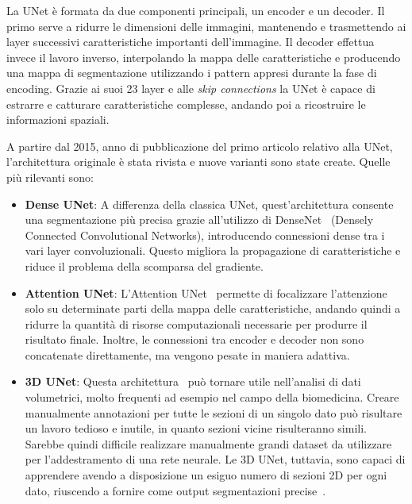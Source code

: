 \documentclass[12pt]{report}
\begin{document}
La UNet è formata da due componenti principali, un encoder e un decoder. Il primo serve a ridurre le dimensioni delle immagini, mantenendo e trasmettendo ai layer successivi caratteristiche importanti dell'immagine. Il decoder effettua invece il lavoro inverso, interpolando la mappa delle caratteristiche e producendo una mappa di segmentazione utilizzando i pattern appresi durante la fase di encoding. Grazie ai suoi 23 layer e alle \textit{skip connections} la UNet è capace di estrarre e catturare caratteristiche complesse, andando poi a ricostruire le informazioni spaziali.

A partire dal 2015, anno di pubblicazione del primo articolo relativo alla UNet, l'architettura originale è stata rivista e nuove varianti sono state create. Quelle più rilevanti sono:

\begin{itemize}
	\item \textbf{Dense UNet}: A differenza della classica UNet, quest'architettura consente una segmentazione più precisa grazie all'utilizzo di DenseNet~\cite{8296389} (Densely Connected Convolutional Networks), introducendo connessioni dense tra i vari layer convoluzionali. Questo migliora la propagazione di caratteristiche e riduce il problema della scomparsa del gradiente.
	
	\item \textbf{Attention UNet}: L'Attention UNet~\cite{oktay2018attentionunetlearninglook} permette di focalizzare l'attenzione solo su determinate parti della mappa delle caratteristiche, andando quindi a ridurre la quantità di risorse computazionali necessarie per produrre il risultato finale. Inoltre, le connessioni tra encoder e decoder non sono concatenate direttamente, ma vengono pesate in maniera adattiva.
	
	\item \textbf{3D UNet}: Questa architettura~\cite{çiçek20163dunetlearningdense} può tornare utile nell'analisi di dati volumetrici, molto frequenti ad esempio nel campo della biomedicina. Creare manualmente annotazioni per tutte le sezioni di un singolo dato può risultare un lavoro tedioso e inutile, in quanto sezioni vicine risulteranno simili. Sarebbe quindi difficile realizzare manualmente grandi dataset da utilizzare per l'addestramento di una rete neurale. Le 3D UNet, tuttavia, sono capaci di apprendere avendo a disposizione un esiguo numero di sezioni 2D per ogni dato, riuscendo a fornire come output segmentazioni precise~\cite{çiçek20163dunetlearningdense}.
\end{itemize}
\end{document}
